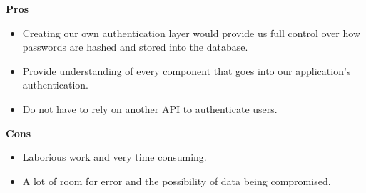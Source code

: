 \documentclass[onecolumn, draftclsnofoot,10pt, compsoc]{IEEEtran}
\begin{document}
\textbf{Pros}
\begin{itemize}
    \item Creating our own authentication layer would provide us full control over how passwords are hashed and stored into the database. 
    \item Provide understanding of every component that goes into our application's authentication.
    \item Do not have to rely on another API to authenticate users.
\end{itemize}
\textbf{Cons}
\begin{itemize}
    \item Laborious work and very time consuming.
    \item A lot of room for error and the possibility of data being compromised.
\end{itemize}
\end{document}
